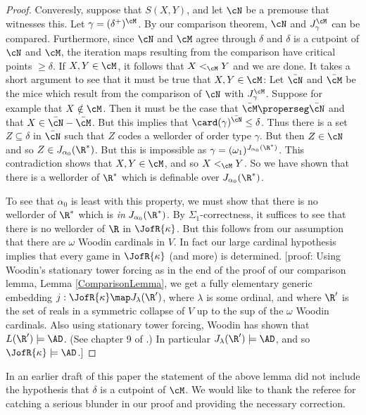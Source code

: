\begin{proof}
Converesly, suppose that $S(X,Y)$, and let $\cN$ be a premouse that
witnesses this. Let $\gamma=(\delta^+)^{\cM}$. By our comparison theorem,
$\cN$ and $J^{\cM}_{\gamma}$ can be compared. Furthermore, since
$\cN$ and $\cM$ agree through $\delta$ and $\delta$ is a cutpoint of
$\cN$ and $\cM$, the iteration maps resulting from the comparison have
critical points $\geq \delta$. If $X,Y\in\cM$, it follows that
$X<_{\cM}Y$ and we are done. It takes a short argument to see that
it must be true that $X,Y\in\cM$: Let $\bar{\cN}$ and $\bar{\cM}$ be
the mice which result from the comparison of $\cN$ with $J^{\cM}_{\gamma}$.
Suppose for example that $X\notin\cM$. Then it must be the case that
$\bar{\cM}\properseg\bar{\cN}$ and that $X\in\bar{\cN}-\bar{\cM}$. But this
implies that $\card(\gamma)^{\bar{\cN}}\leq\delta$. Thus there is a
set $Z\subseteq\delta$ in $\bar{\cN}$ such that $Z$ codes a wellorder of
order type $\gamma$. But then $Z\in\cN$ and so $Z\in J_{\alpha_0}(\R^*)$.
But this is impossible as $\gamma=(\omega_1)^{J_{\alpha_0}(\R^*)}$.
This contradiction shows that $X,Y\in\cM$, and so $X<_{\cM}Y$.
So we have shown that there is a wellorder of $\R^*$ which is definable
over $J_{\alpha_0}(\R^*)$.

To see that $\alpha_0$ is least with this property,
we must show that there is no
wellorder of $\R^*$ which is \emph{in} $J_{\alpha_0}(\R^*)$. By
$\Sigma_1$-correctness, it suffices to see that there is no
wellorder of $\R$ in $\JofR{\kappa}$. But this follows from our
assumption that there are $\omega$ Woodin cardinals in $V$. In fact
our large cardinal hypothesis implies that every game in
$\JofR{\kappa}$ (and more) is determined. [proof: Using Woodin's
stationary tower forcing as in the end of the
proof of our comparison lemma, Lemma \ref{ComparisonLemma}, we get
a fully elementary generic embedding
$j:\JofR{\kappa}\map J_{\lambda}(\R^{\prime})$, where $\lambda$ is
some ordinal, and where $\R^{\prime}$ is the set of reals in a symmetric
collapse of $V$ up to the sup of the $\omega$ Woodin cardinals. Also
using stationary tower forcing, Woodin has shown that
$L(\R^{\prime})\models\AD$. (See chapter 9 of \cite{Martin_Book}.)
In particular $J_{\lambda}(\R^{\prime})\models\AD$, and so
$\JofR{\kappa}\models\AD$.]
\end{proof}

In an earlier draft of this paper the statement of the above lemma did
not include the hypothesis that $\delta$ is a cutpoint of $\cM$.
We would like to thank the referee for catching a serious blunder
in our proof and providing the necessary correction.

